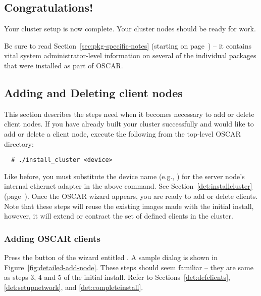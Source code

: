 
\subsection{Congratulations!}

Your cluster setup is now complete. Your cluster nodes should
be ready for work.

Be sure to read Section~\ref{sec:pkg-specific-notes} (starting on
page~\pageref{sec:pkg-specific-notes}) -- it contains vital system
administrator-level information on several of the individual packages
that were installed as part of OSCAR.


\subsection{Adding and Deleting client nodes}

This section describes the steps need when it becomes necessary to add
or delete client nodes. If you have already built your cluster
successfully and would like to add or delete a client node, execute
the following from the top-level OSCAR directory:

\begin{verbatim}
  # ./install_cluster <device>
\end{verbatim}

Like before, you must substitute the device name (e.g., )
for the server node's internal ethernet adapter in the above command.
See Section~\ref{det:installcluster}
(page~\pageref{det:installcluster}). Once the OSCAR wizard appears,
you are ready to add or delete clients. Note that these steps will
reuse the existing images made with the initial install, however, it
will extend or contract the set of defined clients in the cluster.


\subsubsection{Adding OSCAR clients}

Press the button of the wizard entitled . A
sample dialog is shown in Figure~\ref{fig:detailed-add-node}. These
steps should seem familiar -- they are same as steps 3, 4 and 5 of the
initial install. Refer to Sections~\ref{det:defclients},
\ref{det:setupnetwork}, and \ref{det:completeinstall}.

